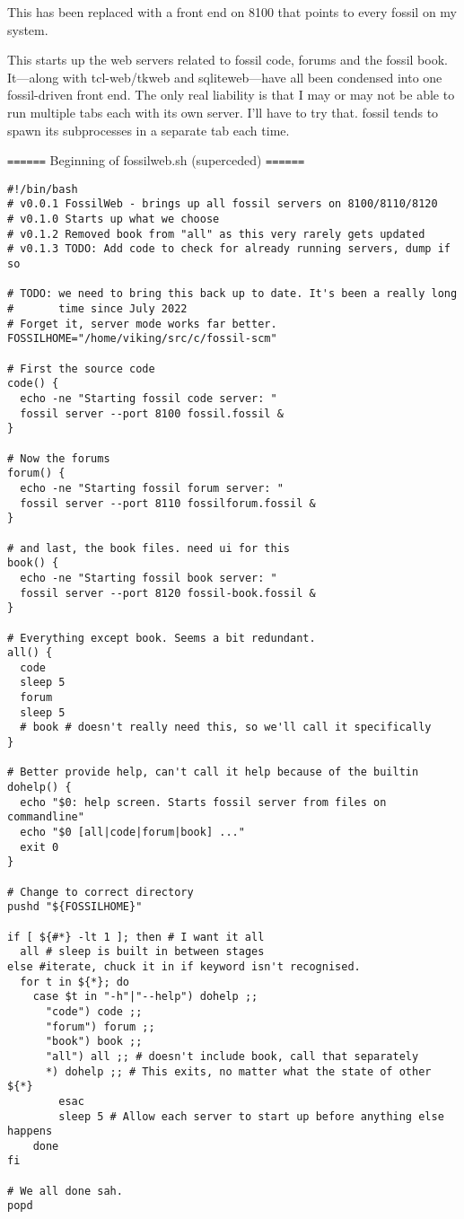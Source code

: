 \documentclass[11pt]{article}
\begin{document}
This has been replaced with a front end on 8100 that points to every fossil on my system.

This starts up the web servers related to fossil code, forums and the fossil book. It—along with
tcl-web/tkweb and sqliteweb—have all been condensed into one fossil-driven front end. The only real
liability is that I may or may not be able to run multiple tabs each with its own server. I'll have
to try that. fossil tends to spawn its subprocesses in a separate tab each time.

\texttt{======} Beginning of fossilweb.sh (superceded) \texttt{======}

\begin{verbatim}
#!/bin/bash
# v0.0.1 FossilWeb - brings up all fossil servers on 8100/8110/8120
# v0.1.0 Starts up what we choose
# v0.1.2 Removed book from "all" as this very rarely gets updated
# v0.1.3 TODO: Add code to check for already running servers, dump if so

# TODO: we need to bring this back up to date. It's been a really long
#       time since July 2022
# Forget it, server mode works far better.
FOSSILHOME="/home/viking/src/c/fossil-scm"

# First the source code
code() {
  echo -ne "Starting fossil code server: "
  fossil server --port 8100 fossil.fossil &
}

# Now the forums
forum() {
  echo -ne "Starting fossil forum server: "
  fossil server --port 8110 fossilforum.fossil &
}

# and last, the book files. need ui for this
book() {
  echo -ne "Starting fossil book server: "
  fossil server --port 8120 fossil-book.fossil &
}

# Everything except book. Seems a bit redundant.
all() {
  code
  sleep 5
  forum
  sleep 5
  # book # doesn't really need this, so we'll call it specifically
}

# Better provide help, can't call it help because of the builtin
dohelp() {
  echo "$0: help screen. Starts fossil server from files on commandline"
  echo "$0 [all|code|forum|book] ..."
  exit 0
}

# Change to correct directory
pushd "${FOSSILHOME}"

if [ ${#*} -lt 1 ]; then # I want it all
  all # sleep is built in between stages
else #iterate, chuck it in if keyword isn't recognised.
  for t in ${*}; do
    case $t in "-h"|"--help") dohelp ;;
      "code") code ;;
      "forum") forum ;;
      "book") book ;;
      "all") all ;; # doesn't include book, call that separately
      *) dohelp ;; # This exits, no matter what the state of other ${*}
		esac
		sleep 5 # Allow each server to start up before anything else happens
	done
fi

# We all done sah.
popd

\end{verbatim}
\end{document}
